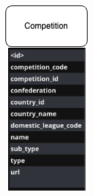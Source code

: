 \documentclass{Configuration_Files/PoliMi3i_thesis}
\begin{document}
\begin{figure}[htbp]
\begin{subfigure}[b]{0.2\linewidth}
  \end{subfigure}
  \hfill
  \begin{subfigure}[b]{0.2\linewidth}
    \includegraphics[width=\linewidth]{Project Template/Images/entities/comp.drawio.png}

\end{subfigure}
\end{figure}
\end{document}
